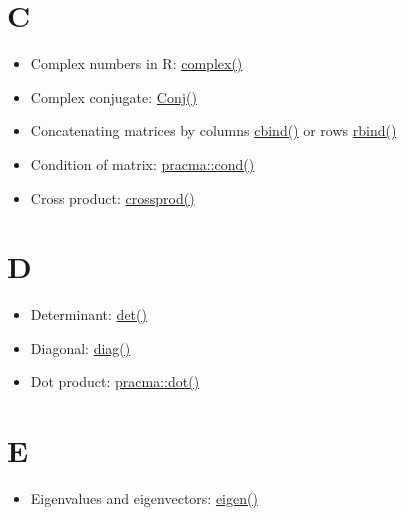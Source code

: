 \documentclass[
]{book}
\providecommand{\tightlist}{%
  \setlength{\itemsep}{0pt}\setlength{\parskip}{0pt}}
\begin{document}
\hypertarget{c}{%
\section*{C}\label{c}}

\begin{itemize}
\tightlist
\item
  Complex numbers in R: \href{https://stat.ethz.ch/R-manual/R-patched/library/base/html/complex.html}{complex()}
\item
  Complex conjugate: \href{https://stat.ethz.ch/R-manual/R-patched/library/base/html/complex.html}{Conj()}
\item
  Concatenating matrices by columns \href{https://stat.ethz.ch/R-manual/R-patched/library/base/html/cbind.html}{cbind()} or rows \href{https://stat.ethz.ch/R-manual/R-patched/library/base/html/cbind.html}{rbind()}
\item
  Condition of matrix: \href{https://rdrr.io/rforge/pracma/man/cond.html}{pracma::cond()}
\item
  Cross product: \href{https://stat.ethz.ch/R-manual/R-patched/library/base/html/crossprod.html}{crossprod()}
\end{itemize}

\hypertarget{d}{%
\section*{D}\label{d}}

\begin{itemize}
\tightlist
\item
  Determinant: \href{https://stat.ethz.ch/R-manual/R-patched/library/base/html/det.html}{det()}
\item
  Diagonal: \href{https://stat.ethz.ch/R-manual/R-patched/library/base/html/diag.html}{diag()}
\item
  Dot product: \href{https://rdrr.io/rforge/pracma/man/dot.html}{pracma::dot()}
\end{itemize}

\hypertarget{e}{%
\section*{E}\label{e}}

\begin{itemize}
\tightlist
\item
  Eigenvalues and eigenvectors: \href{https://stat.ethz.ch/R-manual/R-devel/library/base/html/eigen.html}{eigen()}
\end{itemize}
\end{document}
